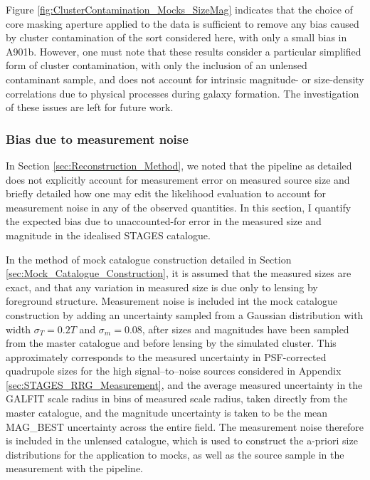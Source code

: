 \documentclass[useAMS,usenatbib,times,letter,amssymb]{mn2e}
\begin{document}
Figure \ref{fig:ClusterContamination_Mocks_SizeMag} indicates that the choice of core masking aperture applied to the data is sufficient to remove any bias caused by cluster contamination of the sort considered here, with only a small bias in A901b.  However, one must note that these results consider a particular simplified form of cluster contamination, with only the inclusion of an unlensed contaminant sample, and does not account for intrinsic magnitude- or size-density correlations due to physical processes during galaxy formation. The investigation of these issues are left for future work.


\subsubsection{Bias due to measurement noise}\label{sec:NoiseBias}

In Section \ref{sec:Reconstruction_Method}, we noted that the pipeline as detailed does not explicitly account for measurement error on measured source size and briefly detailed how one may edit the likelihood evaluation to account for measurement noise in any of the observed quantities. In this section, I quantify the expected bias due to unaccounted-for error in the measured size and magnitude in the idealised STAGES catalogue.

In the method of mock catalogue construction detailed in Section \ref{sec:Mock_Catalogue_Construction}, it is assumed that the measured sizes are exact, and that any variation in measured size is due only to lensing by foreground structure. Measurement noise is included int the mock catalogue construction by adding an uncertainty sampled from a Gaussian distribution with width $\sigma_T = 0.2T$ and $\sigma_m = 0.08$, after sizes and magnitudes have been sampled from the master catalogue and before lensing by the simulated cluster. This approximately corresponds to the measured uncertainty in PSF-corrected quadrupole sizes for the high signal--to--noise sources considered in Appendix \ref{sec:STAGES_RRG_Measurement}, and the average measured uncertainty in the GALFIT scale radius in bins of measured scale radius, taken directly from the master catalogue, and the magnitude uncertainty is taken to be the mean MAG\_BEST uncertainty across the entire field. The measurement noise therefore is included in the unlensed catalogue, which is used to construct the a-priori size distributions for the application to mocks, as well as the source sample in the measurement with the pipeline. 
\end{document}
